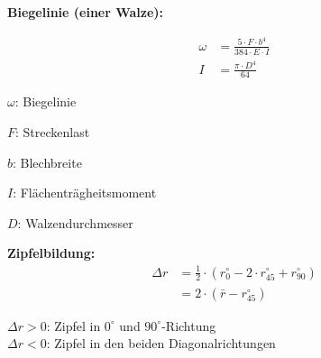 \textbf{Biegelinie (einer Walze):}\\
\begin{minipage}{0.5\linewidth}
    \[
    \boxed{      
        \begin{aligned}
            \omega &= \frac{5 \cdot F \cdot b^4}{384 \cdot E \cdot I}\\
            I &= \frac{\pi  \cdot D^4}{64}
        \end{aligned}
    }
    \]
\end{minipage}
\begin{minipage}{0.5\linewidth}
    \item $\omega$: Biegelinie
    \item $F$: Streckenlast
    \item $b$: Blechbreite
    \item $I$: Flächenträgheitsmoment
    \item $D$: Walzendurchmesser
\end{minipage}
\vspace{1mm}

\textbf{Zipfelbildung:}\\
\[
\boxed{      
    \begin{aligned}
        \Delta r &= \frac{1}{2}\cdot(r_0^\circ - 2\cdot r_{45}^\circ + r_{90}^\circ)\\
        &= 2\cdot(\bar{r} - r_{45}^\circ)
    \end{aligned}
}
\]

$\Delta r > 0$: Zipfel in $0^\circ$ und $90^\circ$-Richtung\\
$\Delta r < 0$: Zipfel in den beiden Diagonalrichtungen\\
\vfill \null \columnbreak


